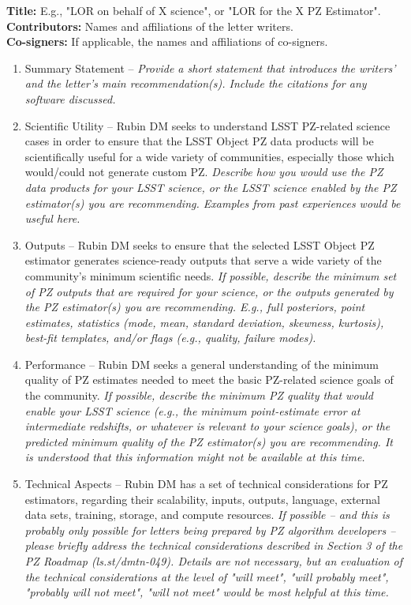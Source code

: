 \documentclass[DM,authoryear,toc]{lsstdoc}
\begin{document}
\textbf{Title:} E.g., "LOR on behalf of X science", or "LOR for the X PZ Estimator". \\
\textbf{Contributors:} Names and affiliations of the letter writers. \\
\textbf{Co-signers:} If applicable, the names and affiliations of co-signers.

\begin{enumerate}
\item Summary Statement -- 
\textit{Provide a short statement that introduces the writers' and the letter's main recommendation(s).
Include the citations for any software discussed.
}
\item Scientific Utility -- 
Rubin DM seeks to understand LSST PZ-related science cases in order to ensure that the LSST Object PZ data products will be scientifically useful for a wide variety of communities, especially those which would/could not generate custom PZ. 
\textit{Describe how you would use the PZ data products for your LSST science, or the LSST science enabled by the PZ estimator(s) you are recommending.
Examples from past experiences would be useful here.
}
\item Outputs -- 
Rubin DM seeks to ensure that the selected LSST Object PZ estimator generates science-ready outputs that serve a wide variety of the community's minimum scientific needs. 
\textit{If possible, describe the minimum set of PZ outputs that are required for your science, or the outputs generated by the PZ estimator(s) you are recommending.
E.g., full posteriors, point estimates, statistics (mode, mean, standard deviation, skewness, kurtosis), best-fit templates, and/or flags (e.g., quality, failure modes).
}
\item Performance -- 
Rubin DM seeks a general understanding of the minimum quality of PZ estimates needed to meet the basic PZ-related science goals of the community.
\textit{If possible, describe the minimum PZ quality that would enable your LSST science (e.g., the minimum point-estimate error at intermediate redshifts, or whatever is relevant to your science goals), or the predicted minimum quality of the PZ estimator(s) you are recommending.
It is understood that this information might not be available at this time.
}
\item Technical Aspects -- 
Rubin DM has a set of technical considerations for PZ estimators, regarding their scalability, inputs, outputs, language, external data sets, training, storage, and compute resources.
\textit{If possible -- and this is probably only possible for letters being prepared by PZ algorithm developers -- please briefly address the technical considerations described in Section 3 of the PZ Roadmap (ls.st/dmtn-049).
Details are not necessary, but an evaluation of the technical considerations at the level of "will meet", "will probably meet", "probably will not meet", "will not meet" would be most helpful at this time.
}
\end{enumerate}
\end{document}

